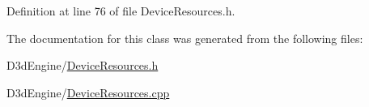 Definition at line 76 of file Device\+Resources.\+h.



The documentation for this class was generated from the following files\+:\begin{DoxyCompactItemize}
\item 
D3d\+Engine/\mbox{\hyperlink{_device_resources_8h}{Device\+Resources.\+h}}\item 
D3d\+Engine/\mbox{\hyperlink{_device_resources_8cpp}{Device\+Resources.\+cpp}}\end{DoxyCompactItemize}
